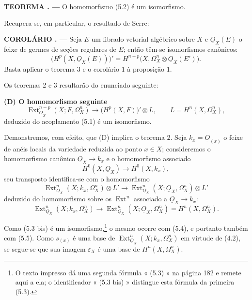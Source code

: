 \documentclass[11pt,twoside,openany]{book}
\numberwithin{equation}{section}
\newcommand{\src}[1]{%
  \phantomsection\hypertarget{src:#1}{}%
  \marginpar{\raggedleft\footnotesize\sffamily #1}%
}
\newcommand{\Osh}{\underline{O}}
\theoremstyle{plain}
\theoremstyle{definition}
\theoremstyle{remark}
\newcommand{\result}[2]{%
  \par\medskip\noindent\textbf{#1%
  \if\relax\detokenize{#2}\relax\else\space#2\fi. ---}\enspace
}
\newcommand{\FgaUnitKey}{frontmatter}
\renewcommand{\src}[1]{%
  \phantomsection\hypertarget{src:\FgaUnitKey:#1}{}%
  \marginpar{\raggedleft\footnotesize\sffamily #1}%
}
\begin{document}
\result{TEOREMA}{3} O homomorfismo (5.2) é um isomorfismo.

Recupera-se, em particular, o resultado de Serre:

\result{COROLÁRIO}{} Seja $E$ um fibrado vetorial algébrico sobre $X$ e
$\Osh_X(E)$ o feixe de germes de seções regulares de $E$; então têm-se
isomorfismos canônicos:
\begin{equation}\tag{5.3}
  \bigl(H^{p}(X,\Osh_X(E))\bigr)'
  =H^{n-p}\bigl(X,\Omega_X^{n}\otimes\Osh_X(E')\bigr).
\end{equation}
Basta aplicar o teorema 3 e o corolário 1 à proposição 1.

Os teoremas 2 e 3 resultarão do enunciado seguinte:

\noindent\textbf{(D) O homomorfismo seguinte}
\begin{equation}\tag{5.2 bis}
  \operatorname{Ext}_{\Osh_X}^{n-p}(X;F,\Omega_X^{n})
  \longrightarrow\bigl(H^{p}(X,F)\bigr)'\otimes L,
  \qquad L=H^{n}(X,\Omega_X^{n}),
\end{equation}
deduzido do acoplamento (5.1) é um isomorfismo.

Demonstremos, com efeito, que (D) implica o teorema 2. Seja
$k_x=\Osh_{(x)}$ o feixe de anéis locais da variedade reduzida ao ponto
$x\in X$; consideremos o homomorfismo canônico
$\Osh_X\longrightarrow k_x$ e o homomorfismo associado
\begin{equation}\tag{5.3 bis}
  H^{0}(X,\Osh_X)\longrightarrow H^{0}(X,k_x),
\end{equation}
seu transposto identifica-se com o homomorfismo
\begin{equation}\tag{5.4}
  \operatorname{Ext}_{\Osh_X}^{n}(X;k_x,\Omega_X^{n})\otimes L'
  \longrightarrow
  \operatorname{Ext}_{\Osh_X}^{n}(X;\Osh_X,\Omega_X^{n})\otimes L'
\end{equation}
deduzido do homomorfismo sobre os $\operatorname{Ext}^{n}$ associado a
$\Osh_X\longrightarrow k_x$:
\begin{equation}\tag{5.5}
  \operatorname{Ext}_{\Osh_X}^{n}(X;k_x,\Omega_X^{n})
  \longrightarrow
  \operatorname{Ext}_{\Osh_X}^{n}(X;\Osh_X,\Omega_X^{n})
  =H^{n}(X,\Omega_X^{n}).
\end{equation}

\src{183}
Como (5.3 bis) é um isomorfismo,\footnote{O texto impresso dá uma
segunda fórmula « (5.3) » na página 182 e remete aqui a ela; o identificador
« (5.3 bis) » distingue esta fórmula da primeira (5.3).} o mesmo ocorre
com (5.4), e portanto também com (5.5). Como $s_{(x)}$ é uma base de
$\operatorname{Ext}_{\Osh_X}^{n}(X;k_x,\Omega_X^{n})$ em virtude de (4.2), se
segue-se que sua imagem $\varepsilon_X$ é uma base de
$H^{n}(X,\Omega_X^{n})$.
\end{document}
